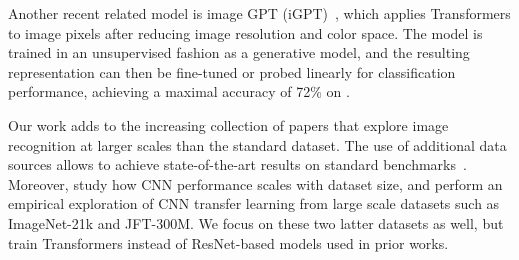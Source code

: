 Another recent related model is image GPT (iGPT)~\citep{chen20-igpt}, which applies Transformers to image pixels after reducing image resolution and color space. The model is trained in an unsupervised fashion as a generative model, and the resulting representation can then be fine-tuned or probed linearly for classification performance, achieving a maximal accuracy of 72\% on \imagenet.


Our work adds to the increasing collection of papers that explore image recognition at larger scales than the standard \imagenet dataset.
The use of additional data sources allows to achieve state-of-the-art results on standard benchmarks~\citep{mahajan2018, touvron2019, xie2020-noisystudent}.
Moreover, \citet{sun2017-jft} study how CNN performance scales with dataset size, and \citet{kolesnikov2020-bit, djolonga2020-robustness} perform an empirical exploration of CNN transfer learning from large scale datasets such as ImageNet-21k and JFT-300M.
We focus on these two latter datasets as well, but train Transformers instead of ResNet-based models used in prior works. 


